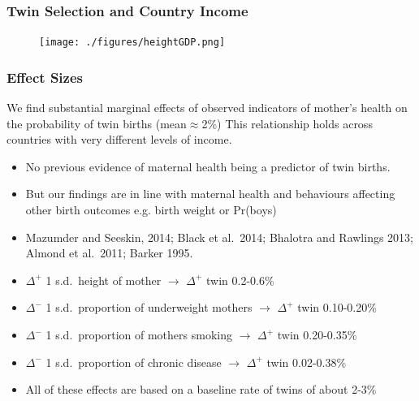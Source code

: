 \documentclass[9pt,letterpaper,subeqn]{beamer}
\begin{document}
\begin{frame}[label=Spain2]

\end{frame}

\begin{frame}[label=HealthGDP]
\frametitle{Twin Selection and Country Income}
\begin{figure}[htpb!]
\centering
  \texttt{[image: ./figures/heightGDP.png]}
\end{figure}
\hyperlink{EducGDP}{}
\end{frame}



\begin{frame}[label=robust]
\frametitle{Effect Sizes}
We find substantial marginal effects of observed indicators of mother’s health on the probability of twin births (mean$\approx$2\%)
This relationship holds across countries with very different levels of income.
\begin{itemize}
\item No previous evidence of maternal health being a predictor of twin births.
\item But our findings are in line with maternal health and behaviours affecting other birth outcomes e.g. birth weight or Pr(boys) 
\item Mazumder and Seeskin, 2014; Black et al.\ 2014;  Bhalotra and Rawlings 2013; Almond et al.\ 2011; Barker 1995.
  \item $\Delta^+$ 1 s.d.\ height of mother $\rightarrow$ $\Delta^+$ twin 0.2-0.6\% 
  \item $\Delta^-$ 1 s.d.\ proportion of underweight mothers $\rightarrow$ $\Delta^+$ twin 0.10-0.20\%
  \item $\Delta^-$ 1 s.d.\ proportion of mothers smoking $\rightarrow$ $\Delta^+$ twin 0.20-0.35\%
  \item $\Delta^-$ 1 s.d.\ proportion of chronic disease $\rightarrow$ $\Delta^+$ twin 0.02-0.38\%
  \item All of these effects are based on a baseline rate of twins of about 2-3\%
\end{itemize}
\end{frame}
\end{document}
